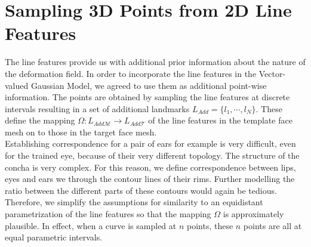\section{Sampling 3D Points from 2D Line Features} 
The line features provide us with additional prior information about the nature of the deformation field. In order to incorporate the line features in the Vector-valued Gaussian Model, we agreed to use them as additional point-wise information. The points are obtained by sampling the line features at discrete intervals resulting in a set of additional landmarks $L_{Add} = \{l_{1}, \cdots, l_{N}\}$. These define the mapping $\Omega:L_{Add\mathcal{M}} \rightarrow L_{Add\mathcal{T}}$ of the line features in the template face mesh on to those in the target face mesh.\\
Establishing correspondence for a pair of ears for example is very difficult, even for
the trained eye, because of their very different topology. The structure of the concha is very
complex. For this reason, we define correspondence between lips, eyes and ears we through the contour lines of their rims. Further modelling the ratio between the different parts of these contours would again be tedious. Therefore, we simplify the assumptions for similarity to an equidistant parametrization of the line features so that the mapping $\Omega$ is approximately plausible. In effect, when a curve is sampled at $n$ points, these $n$ points are all at equal parametric intervals.

\def\earpathf{(-1,1.5) .. controls (-1,2.3) and (1,2.8) .. (1,1.5) .. controls (1, -.2) and (0.3,-.1) .. (0.3,-1) .. controls (0.2,-1.5) and (-.5, -1.7) .. (-1,-1.25);}
\def\earpathl{(3,2) .. controls (3,3.3) and (5.6,3.7) .. (5.6,2) .. controls (5.6, 0) and (4.6,0) .. (4.6,-1.3) .. controls (4.6,-2) and (3.5, -2) .. (3,-1.5);}

